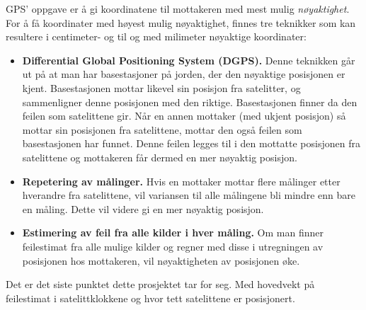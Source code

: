 GPS' oppgave er å gi koordinatene til mottakeren med mest mulig \textit{nøyaktighet}. For å få koordinater med høyest mulig nøyaktighet, finnes tre teknikker som kan resultere i centimeter- og til og med milimeter nøyaktige koordinater: \cite{StrangBorre}
\begin{itemize}
  \item \textbf{Differential Global Positioning System (DGPS).} Denne teknikken går ut på at man har basestasjoner på jorden, der  den nøyaktige posisjonen er kjent. Basestasjonen mottar likevel sin posisjon fra satelitter, og sammenligner denne posisjonen med den riktige. Basestasjonen finner da den feilen som satelittene gir. Når en annen mottaker (med ukjent posisjon) så mottar sin posisjonen fra satelittene, mottar den også feilen som basestasjonen har funnet. Denne feilen legges til i den mottatte posisjonen fra satelittene og mottakeren får dermed en mer nøyaktig posisjon. \cite{DGPS}
  \item \textbf{Repetering av målinger.} Hvis en mottaker mottar flere målinger etter hverandre fra satelittene, vil variansen til alle målingene bli mindre enn bare en måling. Dette vil videre gi en mer nøyaktig posisjon. 
  \item \textbf{Estimering av feil fra alle kilder i hver måling.}  Om man finner feilestimat fra alle mulige kilder og regner med disse i utregningen av posisjonen hos mottakeren, vil nøyaktigheten av posisjonen øke. 
\end{itemize}
Det er det siste punktet dette prosjektet tar for seg. Med hovedvekt på feilestimat i satelittklokkene og hvor tett satelittene er posisjonert. 




	
